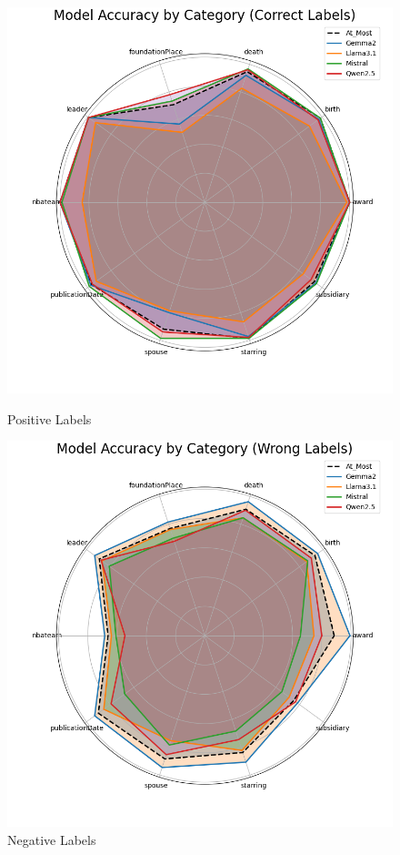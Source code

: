 \begin{figure}[ht!]
    \centering
    \begin{minipage}[b]{0.4\textwidth}
        \centering
        \includegraphics[width=\textwidth]{res/combined_correct_radar_chart}
        \caption{Positive Labels}
        \label{fig:correct-radar-chart}
    \end{minipage}
    \hspace{0.05\textwidth} %
    \begin{minipage}[b]{0.4\textwidth}
        \centering
        \includegraphics[width=\textwidth]{res/combined_wrong_radar_chart}
        \caption{Negative Labels}
        \label{fig:wrong-radar-chart}
    \end{minipage}
\end{figure}

